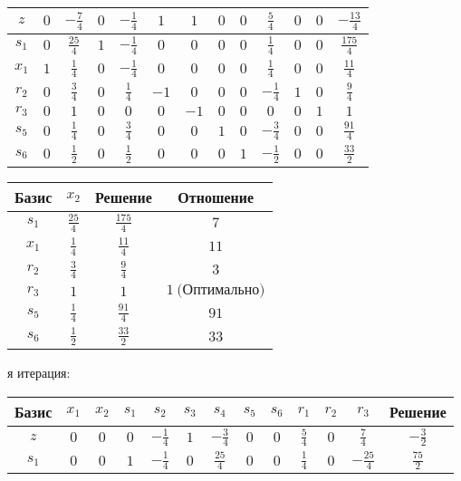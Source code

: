 \documentclass{article}%
\begin{document}
\begin{flushleft}
\begin{tabular}{|c|ccccccccccc|c|}
\hline%
$z$&$0$&$-\frac{7}{4}$&$0$&$-\frac{1}{4}$&$1$&$1$&$0$&$0$&$\frac{5}{4}$&$0$&$0$&$-\frac{13}{4}$\\%
\hline%
$s_{1}$&$0$&$\frac{25}{4}$&$1$&$-\frac{1}{4}$&$0$&$0$&$0$&$0$&$\frac{1}{4}$&$0$&$0$&$\frac{175}{4}$\\%
$x_{1}$&$1$&$\frac{1}{4}$&$0$&$-\frac{1}{4}$&$0$&$0$&$0$&$0$&$\frac{1}{4}$&$0$&$0$&$\frac{11}{4}$\\%
$r_{2}$&$0$&$\frac{3}{4}$&$0$&$\frac{1}{4}$&$-1$&$0$&$0$&$0$&$-\frac{1}{4}$&$1$&$0$&$\frac{9}{4}$\\%
$r_{3}$&$0$&$1$&$0$&$0$&$0$&$-1$&$0$&$0$&$0$&$0$&$1$&$1$\\%
$s_{5}$&$0$&$\frac{1}{4}$&$0$&$\frac{3}{4}$&$0$&$0$&$1$&$0$&$-\frac{3}{4}$&$0$&$0$&$\frac{91}{4}$\\%
$s_{6}$&$0$&$\frac{1}{2}$&$0$&$\frac{1}{2}$&$0$&$0$&$0$&$1$&$-\frac{1}{2}$&$0$&$0$&$\frac{33}{2}$\\%
\hline%
\end{tabular}%
\newline%
\newline%
\newline%
\begin{tabular}{|cccc|}%
\hline%
Базис&$x_{2}$&Решение&Отношение\\%
\hline%
$s_{1}$&$\frac{25}{4}$&$\frac{175}{4}$&$7$\\%
$x_{1}$&$\frac{1}{4}$&$\frac{11}{4}$&$11$\\%
$r_{2}$&$\frac{3}{4}$&$\frac{9}{4}$&$3$\\%
$r_{3}$&$1$&$1$&$1\: \text{(Оптимально)}$\\%
$s_{5}$&$\frac{1}{4}$&$\frac{91}{4}$&$91$\\%
$s_{6}$&$\frac{1}{2}$&$\frac{33}{2}$&$33$\\%
\hline%
\end{tabular}%
\newline%
\newline%
я итерация: %
\newline%
\newline%
\renewcommand{\arraystretch}{1.3}%
\begin{tabular}{|c|ccccccccccc|c|}%
\hline%
Базис&$x_{1}$&$x_{2}$&$s_{1}$&$s_{2}$&$s_{3}$&$s_{4}$&$s_{5}$&$s_{6}$&$r_{1}$&$r_{2}$&$r_{3}$&Решение\\%
\hline%
$z$&$0$&$0$&$0$&$-\frac{1}{4}$&$1$&$-\frac{3}{4}$&$0$&$0$&$\frac{5}{4}$&$0$&$\frac{7}{4}$&$-\frac{3}{2}$\\%
\hline%
$s_{1}$&$0$&$0$&$1$&$-\frac{1}{4}$&$0$&$\frac{25}{4}$&$0$&$0$&$\frac{1}{4}$&$0$&$-\frac{25}{4}$&$\frac{75}{2}$\\%

\end{tabular}
\end{flushleft}
\end{document}

